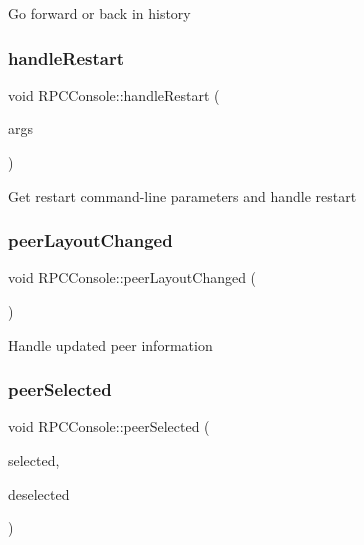 Go forward or back in history \mbox{\label{class_r_p_c_console_a1aab203ab026fb80bd8aeb41f510b682}} 
\subsubsection{\texorpdfstring{handle\+Restart}{handleRestart}}
{\footnotesize\ttfamily void R\+P\+C\+Console\+::handle\+Restart (\begin{DoxyParamCaption}\item[{Q\+String\+List}]{args }\end{DoxyParamCaption})\hspace{0.3cm}{\ttfamily [signal]}}

Get restart command-\/line parameters and handle restart \mbox{\label{class_r_p_c_console_af952ebc6484c8f7d1262fa0bceed41bf}} 
\subsubsection{\texorpdfstring{peer\+Layout\+Changed}{peerLayoutChanged}}
{\footnotesize\ttfamily void R\+P\+C\+Console\+::peer\+Layout\+Changed (\begin{DoxyParamCaption}{ }\end{DoxyParamCaption})\hspace{0.3cm}{\ttfamily [slot]}}

Handle updated peer information \mbox{\label{class_r_p_c_console_a2487fa6a90cddcbb17ae4bb13ecc5359}} 
\subsubsection{\texorpdfstring{peer\+Selected}{peerSelected}}
{\footnotesize\ttfamily void R\+P\+C\+Console\+::peer\+Selected (\begin{DoxyParamCaption}\item[{const Q\+Item\+Selection \&}]{selected,  }\item[{const Q\+Item\+Selection \&}]{deselected }\end{DoxyParamCaption})\hspace{0.3cm}{\ttfamily [slot]}}

